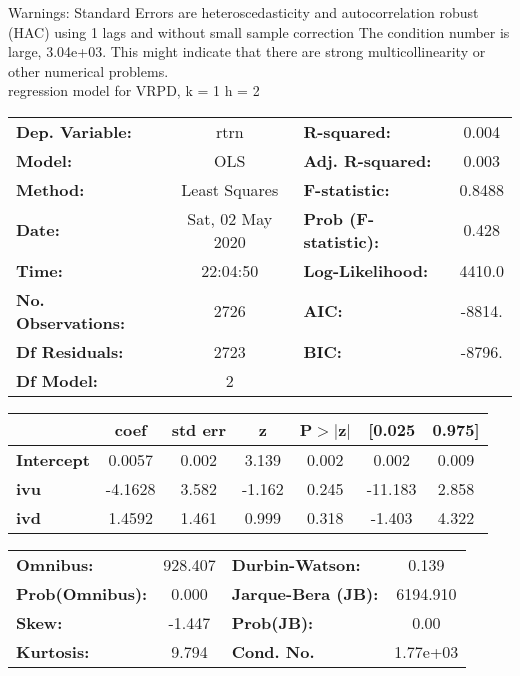 Warnings: \newline
 [1] Standard Errors are heteroscedasticity and autocorrelation robust (HAC) using 1 lags and without small sample correction \newline
 [2] The condition number is large, 3.04e+03. This might indicate that there are \newline
 strong multicollinearity or other numerical problems.\\ 

regression model for VRPD, k = 1 h = 2\begin{center}
\begin{tabular}{lclc}
\toprule
\textbf{Dep. Variable:}    &       rtrn       & \textbf{  R-squared:         } &     0.004   \\
\textbf{Model:}            &       OLS        & \textbf{  Adj. R-squared:    } &     0.003   \\
\textbf{Method:}           &  Least Squares   & \textbf{  F-statistic:       } &    0.8488   \\
\textbf{Date:}             & Sat, 02 May 2020 & \textbf{  Prob (F-statistic):} &    0.428    \\
\textbf{Time:}             &     22:04:50     & \textbf{  Log-Likelihood:    } &    4410.0   \\
\textbf{No. Observations:} &        2726      & \textbf{  AIC:               } &    -8814.   \\
\textbf{Df Residuals:}     &        2723      & \textbf{  BIC:               } &    -8796.   \\
\textbf{Df Model:}         &           2      & \textbf{                     } &             \\
\bottomrule
\end{tabular}
\begin{tabular}{lcccccc}
                   & \textbf{coef} & \textbf{std err} & \textbf{z} & \textbf{P$> |$z$|$} & \textbf{[0.025} & \textbf{0.975]}  \\
\midrule
\textbf{Intercept} &       0.0057  &        0.002     &     3.139  &         0.002        &        0.002    &        0.009     \\
\textbf{ivu}       &      -4.1628  &        3.582     &    -1.162  &         0.245        &      -11.183    &        2.858     \\
\textbf{ivd}       &       1.4592  &        1.461     &     0.999  &         0.318        &       -1.403    &        4.322     \\
\bottomrule
\end{tabular}
\begin{tabular}{lclc}
\textbf{Omnibus:}       & 928.407 & \textbf{  Durbin-Watson:     } &    0.139  \\
\textbf{Prob(Omnibus):} &   0.000 & \textbf{  Jarque-Bera (JB):  } & 6194.910  \\
\textbf{Skew:}          &  -1.447 & \textbf{  Prob(JB):          } &     0.00  \\
\textbf{Kurtosis:}      &   9.794 & \textbf{  Cond. No.          } & 1.77e+03  \\
\bottomrule
\end{tabular}
\end{center}

